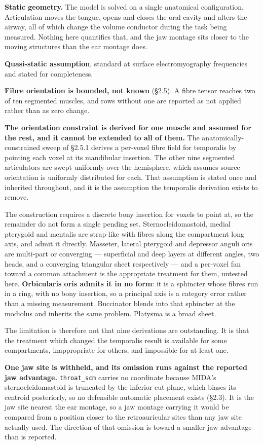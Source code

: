 \documentclass[
  11pt,
]{article}
\begin{document}
\textbf{Static geometry.} The model is solved on a single anatomical configuration.
Articulation moves the tongue, opens and closes the oral cavity and alters the
airway, all of which change the volume conductor during the task being measured.
Nothing here quantifies that, and the jaw montage sits closer to the moving
structures than the ear montage does.

\textbf{Quasi-static assumption}, standard at surface electromyography frequencies
and stated for completeness.

\textbf{Fibre orientation is bounded, not known} (§2.5). A fibre tensor reaches two
of ten segmented muscles, and rows without one are reported as not applied
rather than as zero change.

\textbf{The orientation constraint is derived for one muscle and assumed for the rest,
and it cannot be extended to all of them.} The anatomically-constrained sweep of
§2.5.1 derives a per-voxel fibre field for temporalis by pointing each voxel at
its mandibular insertion. The other nine segmented articulators are swept
uniformly over the hemisphere, which assumes source orientation is uniformly
distributed for each. That assumption is stated once and inherited throughout,
and it is the assumption the temporalis derivation exists to remove.

The construction requires a discrete bony insertion for voxels to point at, so
the remainder do not form a single pending set. Sternocleidomastoid, medial
pterygoid and mentalis are strap-like with fibres along the compartment long
axis, and admit it directly. Masseter, lateral pterygoid and depressor anguli
oris are multi-part or converging --- superficial and deep layers at different
angles, two heads, and a converging triangular sheet respectively --- and a
per-voxel fan toward a common attachment is the appropriate treatment for them,
untested here. \textbf{Orbicularis oris admits it in no form}: it is a sphincter whose
fibres run in a ring, with no bony insertion, so a principal axis is a category
error rather than a missing measurement. Buccinator blends into that sphincter at
the modiolus and inherits the same problem. Platysma is a broad sheet.

The limitation is therefore not that nine derivations are outstanding. It is that
the treatment which changed the temporalis result is available for some
compartments, inappropriate for others, and impossible for at least one.

\textbf{One jaw site is withheld, and its omission runs against the reported jaw
advantage.} \texttt{throat\_scm} carries no coordinate because MIDA's
sternocleidomastoid is truncated by the inferior cut plane, which biases its
centroid posteriorly, so no defensible automatic placement exists (§2.3). It is
the jaw site nearest the ear montage, so a jaw montage carrying it would be
compared from a position closer to the retroauricular sites than any jaw site
actually used. The direction of that omission is toward a smaller jaw advantage
than is reported.
\end{document}
